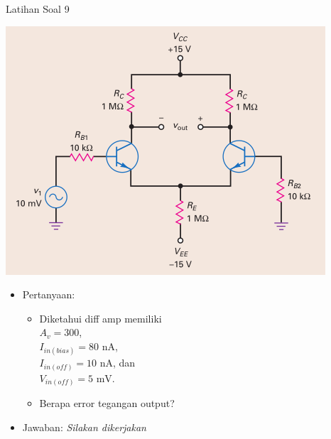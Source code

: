 \documentclass[aspectratio=169]{beamer}
\begin{document}
\begin{frame}{Latihan Soal 9}
	\begin{multicols}{2}
		\begin{center}
			\includegraphics[height=0.7\textheight]{gambar/01.diff-amp/01.contoh_soal_9}
		\end{center}
		\columnbreak
		\begin{itemize}
			\item Pertanyaan:
			\begin{itemize}
				\item Diketahui diff amp memiliki\\
				$ A_v = 300 $, \\
				$ I_{in(bias)} = 80 \text{ nA}$, \\
				$ I_{in(off)} = 10 \text{ nA}$, dan \\
				$ V_{in(off)} = 5 \text{ mV}$.
				\item Berapa error tegangan output?
			\end{itemize}
			\item Jawaban: \textit{Silakan dikerjakan}
		\end{itemize}
	\end{multicols}
\end{frame}
\end{document}
